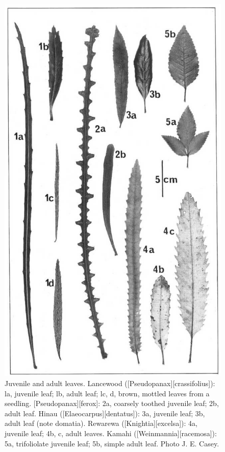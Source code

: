 \begin{figure}[!htb]
\begin{minipage}[t]{0.464\textwidth}
    	\includegraphics[width=\textwidth]{graphics/figure19leaves.jpg}
    	\caption[Juvenile and adult leaves]{Juvenile and adult leaves.
        Lancewood ([Pseudopanax][crassifolius]): la, juvenile leaf; lb, adult leaf; lc, d, brown, mottled leaves from a seedling. [Pseudopanax][ferox]: 2a, coarsely toothed juvenile leaf; 2b, adult leaf.
        Hinau ([Elaeocarpus][dentatus]): 3a, juvenile leaf; 3b, adult leaf (note domatia).
        Rewarewa ([Knightia][excelsa]): 4a, juvenile leaf; 4b, c, adult leaves.
        Kamahi ([Weinmannia][racemosa]): 5a, trifoliolate juvenile leaf; 5b, simple adult leaf.
        Photo  J. E. Casey.}%
    	\label{fig:19leaves}
	\end{minipage}
\end{figure}

